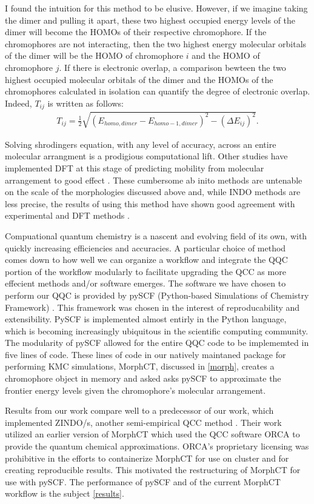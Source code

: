 I found the intuition for this method to be elusive. However, if we imagine
taking the dimer and pulling it apart, these two highest occupied energy levels of the dimer 
will become the HOMOs of their respective chromophore. If the chromophores are not interacting, 
then the two highest energy molecular orbitals of the dimer will be the HOMO of chromophore $i$ and the 
HOMO of chromophore $j$. If there is electronic overlap, a comparison bewteen the two highest occupied
molecular orbitals of the dimer and the HOMOs of the chromophores calculated in isolation can quantify the degree of
electronic overlap. Indeed, $T_{ij}$ is written as follows:
\begin{align}
    T_{ij} = \frac{1}{2}\sqrt{ (E_{homo,dimer} - E_{homo-1,dimer})^{2} - (\Delta E_{ij})^{2} }.
\end{align}
 

Solving shrodingers equation, with any level of accuracy,
across an entire molecular arrangment is a prodigious computational lift.
Other studies have implemented DFT at this stage of predicting
mobility from molecular arrangement to good effect \cite{Deng2004}. These cumbersome ab inito methods are
untenable on the scale of the morphologies discussed above and, while INDO methods are less precise, the results
of using this method have shown good agreement with experimental and DFT methods \cite{Bredas2002}. 

Compuational quantum chemistry is a nascent and evolving field of its
own, with quickly increasing efficiencies and accuracies.
A particular 
choice of method comes down to how well we can organize a workflow and integrate the QQC portion of the
workflow modularly to facilitate upgrading the QCC as more effecient methods and/or software emerges.
The software we have chosen to perform our QQC is
provided by pySCF (Python-based Simulations of Chemistry Framework) \cite{Sun2018a}. This framework
was chosen in the interest of reproducability and extensibility.
PySCF is implemented almost entirly in the Python 
language, which is becoming increasingly ubiquitous in the scientific computing community. The modularity of
pySCF allowed for the entire QQC code to be implememted in five lines of code. These lines of code in 
our natively maintaned package
for performing KMC simulations, MorphCT, discussed in
\autoref{morph}, creates a chromophore object in memory and asked asks pySCF to approximate the frontier
energy levels given the chromophore's molecular arrangement.  

Results from our work compare well to a predecessor of our work, which implemented ZINDO/s, another
semi-empirical QCC method \cite{Miller2018a}\cite{jones2017}. 
Their work utilized an earlier version of MorphCT which used the QCC software 
ORCA \cite{Neese2012b} to provide the quantum chemical approximations. 
ORCA's proprietary licensing was prohibitive in the efforts to containerize MorphCT for use on cluster and for
creating reproducible results. This motivated the restructuring of MorphCT for use with pySCF. The
performance of pySCF and of the current MorphCT workflow is the subject \autoref{results}.

